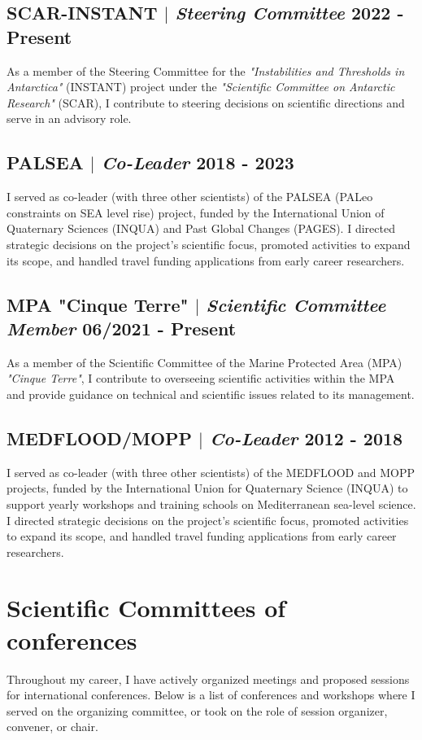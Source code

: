 \documentclass[11pt]{article}
\begin{document}
\subsection{SCAR-INSTANT $|$ {\normalfont\textit{Steering Committee}} \hfill 2022 - Present}
{\footnotesize As a member of the Steering Committee for the \textit{"Instabilities and Thresholds in Antarctica"} (INSTANT) project under the \textit{"Scientific Committee on Antarctic Research"} (SCAR), I contribute to steering decisions on scientific directions and serve in an advisory role.}
\bigskip

\subsection{PALSEA $|$ {\normalfont\textit{Co-Leader}} \hfill 2018 - 2023}
{\footnotesize I served as co-leader (with three other scientists) of the PALSEA (PALeo constraints on SEA level rise) project, funded by the International Union of Quaternary Sciences (INQUA) and Past Global Changes (PAGES). I directed strategic decisions on the project's scientific focus, promoted activities to expand its scope, and handled travel funding applications from early career researchers.}
\bigskip

\subsection{MPA "Cinque Terre" $|$ {\normalfont\textit{Scientific Committee Member}} \hfill 06/2021 - Present}
{\footnotesize As a member of the Scientific Committee of the Marine Protected Area (MPA) \textit{"Cinque Terre"}, I contribute to overseeing scientific activities within the MPA and provide guidance on technical and scientific issues related to its management.}
\bigskip

\subsection{MEDFLOOD/MOPP $|$ {\normalfont\textit{Co-Leader}} \hfill 2012 - 2018}
{\footnotesize I served as co-leader (with three other scientists) of the MEDFLOOD and MOPP projects, funded by the International Union for Quaternary Science (INQUA) to support yearly workshops and training schools on Mediterranean sea-level science. I directed strategic decisions on the project's scientific focus, promoted activities to expand its scope, and handled travel funding applications from early career researchers.}

\section{Scientific Committees of conferences}
{\normalfont Throughout my career, I have actively organized meetings and proposed sessions for international conferences. Below is a list of conferences and workshops where I served on the organizing committee, or took on the role of session organizer, convener, or chair.}\\
\end{document}
